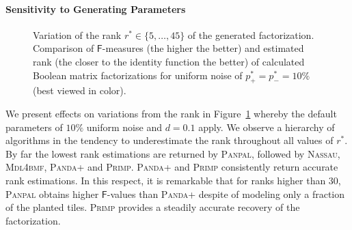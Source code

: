 \paragraph{Sensitivity to Generating Parameters}%
\begin{figure}
\centering

\caption{Variation of the rank $r^*\in\{5,\ldots,45\}$ of the generated factorization. Comparison of $\mathsf{F}$-measures (the higher the better) and estimated rank (the closer to the identity function the better) of calculated Boolean matrix factorizations for uniform noise of $p_+^*=p_-^*=10\%$ (best viewed in color).}
\label{fig:rank}
\end{figure}
We present effects on variations from the rank in Figure~\ref{fig:rank} whereby the default parameters of $10\%$ uniform noise and $d=0.1$ apply. We observe a hierarchy of algorithms in the tendency to underestimate the rank throughout all values of $r^*$. By far the lowest rank estimations are returned by \textsc{Panpal}, followed by \textsc{Nassau}, \textsc{Mdl4bmf}, \textsc{Panda+} and \textsc{Primp}. \textsc{Panda+} and \textsc{Primp} consistently return accurate rank estimations. In this respect, it is remarkable that for ranks higher than 30, \textsc{Panpal} obtains higher $\mathsf{F}$-values than \textsc{Panda+} despite of modeling only a fraction of the planted tiles. \textsc{Primp} provides a steadily accurate recovery of the factorization.

